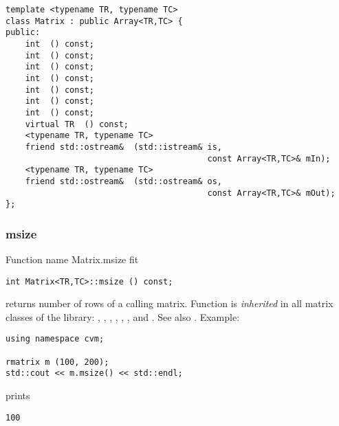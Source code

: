 \bigskip
\noindent%
\verb"template <typename TR, typename TC>"\\
\verb"class Matrix : public Array<TR,TC> {"\\
\verb"public:"\\
\verb"    int "\verb" () const;"\\
\verb"    int "\verb" () const;"\\
\verb"    int "\verb" () const;"\\
\verb"    int "\verb" () const;"\\
\verb"    int "\verb" () const;"\\
\verb"    int "\verb" () const;"\\
\verb"    int "\verb" () const;"\\
\verb"    virtual TR "\verb" () const;"\\
\verb"    <typename TR, typename TC>"\\
\verb"    friend std::ostream& "\verb" (std::istream& is,"\\
\verb"                                         const Array<TR,TC>& mIn);"\\
\verb"    <typename TR, typename TC>"\\
\verb"    friend std::ostream& "\verb" (std::ostream& os,"\\
\verb"                                         const Array<TR,TC>& mOut);"\\
\verb"};"
\newpage


\subsubsection{msize}
Function%
\pdfdest name {Matrix.msize} fit
\begin{verbatim}
int Matrix<TR,TC>::msize () const;
\end{verbatim}
returns  number of rows of a calling matrix.
Function is \emph{inherited} in all matrix classes
of the library:
,   ,
, ,
, ,
 and .
See also .
Example:
\begin{Verbatim}
using namespace cvm;

rmatrix m (100, 200);
std::cout << m.msize() << std::endl;
\end{Verbatim}
prints
\begin{Verbatim}
100
\end{Verbatim}
\newpage



